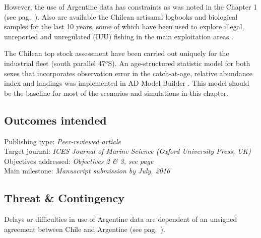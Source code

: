 However, the use of Argentine data has constraints as was noted in the Chapter 1 (see pag.~\pageref{subsec:tconti}). Also are available the Chilean artisanal logbooks and biological samples for the last 10 years, some of which have been used to explore illegal, unreported and unregulated (IUU) fishing in the main exploitation areas \citep{jcq2013}.

The Chilean \acl{top} stock assessment have been carried out uniquely for the industrial fleet (south parallel 47$^o$S). An age-structured statistic model for both sexes that incorporates observation error in the catch-at-age, relative abundance index and landings was implemented in AD Model Builder  \citep{jcq2010}. This model should be the baseline for most of the scenarios and simulations in this chapter.



\subsection*{Outcomes intended}

Publishing type: \textit{Peer-reviewed article} \\
Target journal: \textit{ICES Journal of Marine Science (Oxford University Press, UK)} \\
Objectives addressed: \textit{Objectives 2 \& 3, see page~\pageref{subsec:objetives} }\\
Main milestone: \textit{Manuscript submission by July,  2016}


\subsection*{Threat \& Contingency}

Delays or difficulties in use of  Argentine data are dependent of an unsigned agreement between Chile and Argentine (see pag.~\pageref{subsec:tconti}). \\

